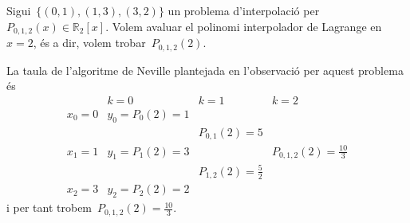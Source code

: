 \documentclass[../../Main.tex]{subfiles}
\begin{document}
	\begin{example}\label{ex:Algorisme de Neville}
		Sigui~\(\{(0,1),(1,3),(3,2)\}\) un problema d'interpolació per~\(P_{0,1,2}(x)\in\mathbb{R}_{2}[x]\).
		Volem avaluar el polinomi interpolador de Lagrange en~\(x=2\), és a dir, volem trobar~\(P_{0,1,2}(2)\).
		\begin{solution}La taula de l'algoritme de Neville plantejada en l'observació  per aquest problema és
			\[\begin{array}{c|ccc}
			& k=0 & k=1 & k=2 \\\hline
			x_{0}=0 & y_{0}=P_{0}(2)=1 & & \\
			& & P_{0,1}(2)=5 &\\
			x_{1}=1 & y_{1}=P_{1}(2)=3 & & P_{0,1,2}(2)=\frac{10}{3}\\
			& & P_{1,2}(2)=\frac{5}{2} &\\
			x_{2}=3 & y_{2}=P_{2}(2)=2 & &
			\end{array}\]
			i per tant trobem~\(P_{0,1,2}(2)=\frac{10}{3}\).
		\end{solution}
	\end{example}
\end{document}
